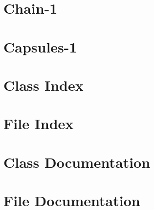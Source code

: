 \documentclass[twoside]{article}
\newcommand{\+}{\discretionary{\mbox{\scriptsize$\hookleftarrow$}}{}{}}
\newcommand{\clearemptydoublepage}{%
  \newpage{\pagestyle{empty}\cleardoublepage}%
}
\begin{document}
\section{Chain-\/1}
\label{chain1}
\hypertarget{chain1}{}

\section{Capsules-\/1}
\label{capsules1}
\hypertarget{capsules1}{}

\section{Class Index}

\section{File Index}

\section{Class Documentation}






\section{File Documentation}









\newpage
{}
\clearemptydoublepage
{}
\printindex
\end{document}
